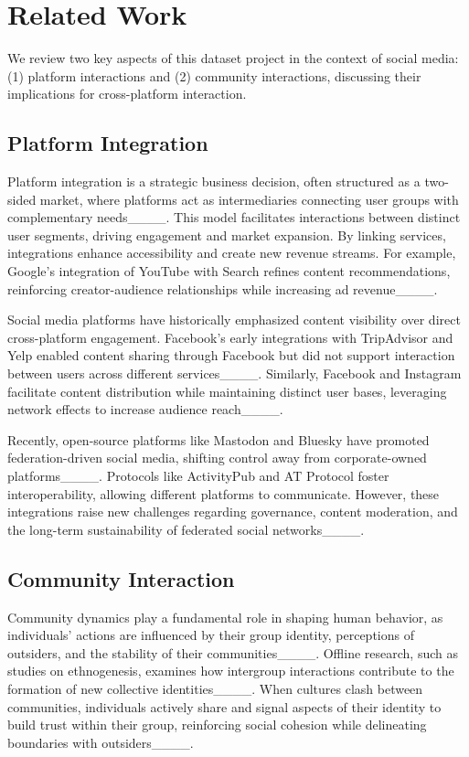 \section{Related Work}
We review two key aspects of this dataset project in the context of social media: (1) platform interactions and (2) community interactions, discussing their implications for cross-platform interaction.

\subsection{Platform Integration}
Platform integration is a strategic business decision, often structured as a two-sided market, where platforms act as intermediaries connecting user groups with complementary needs____. This model facilitates interactions between distinct user segments, driving engagement and market expansion. By linking services, integrations enhance accessibility and create new revenue streams. For example, Google’s integration of YouTube with Search refines content recommendations, reinforcing creator-audience relationships while increasing ad revenue____.


Social media platforms have historically emphasized content visibility over direct cross-platform engagement. Facebook’s early integrations with TripAdvisor and Yelp enabled content sharing through Facebook but did not support interaction between users across different services____. Similarly, Facebook and Instagram facilitate content distribution while maintaining distinct user bases, leveraging network effects to increase audience reach____.

Recently, open-source platforms like Mastodon and Bluesky have promoted federation-driven social media, shifting control away from corporate-owned platforms____. Protocols like ActivityPub and AT Protocol foster interoperability, allowing different platforms to communicate. However, these integrations raise new challenges regarding governance, content moderation, and the long-term sustainability of federated social networks____.


\subsection{Community Interaction}
Community dynamics play a fundamental role in shaping human behavior, as individuals' actions are influenced by their group identity, perceptions of outsiders, and the stability of their communities____. Offline research, such as studies on ethnogenesis, examines how intergroup interactions contribute to the formation of new collective identities____. When cultures clash between communities, individuals actively share and signal aspects of their identity to build trust within their group, reinforcing social cohesion while delineating boundaries with outsiders____.

